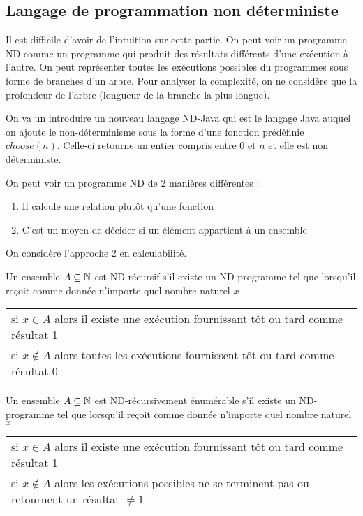 
\subsection{Langage de programmation non déterministe}
\label{ssub:langague_de_programmation_non_d_terministe}

\begin{myrem}
	Il est difficile d'avoir de l'intuition sur cette partie. On peut
	voir un programme ND comme un programme qui produit des résultats
	différents d'une exécution à l'autre. On peut représenter toutes
	les exécutions possibles du programmes sous forme de branches d'un
	arbre. Pour analyser la complexité, on ne
	considère que la profondeur de l'arbre (longueur de la branche
	la plus longue).
\end{myrem}

On va un introduire un nouveau langage ND-Java qui est le langage Java
auquel on ajoute le non-déterminisme sous la forme d'une fonction
prédéfinie $choose(n)$. Celle-ci retourne un entier compris entre $0$ et $n$ et elle
est non déterministe.

On peut voir un programme ND de 2 manières différentes :
\begin{enumerate}
	\item Il calcule une relation plutôt qu'une fonction
	\item C'est un moyen de décider si un élément appartient à un
		ensemble
\end{enumerate}
On considère l'approche 2 en calculabilité.

\begin{mydef}[ND-récursif] \label{def:ND-rec}
	Un ensemble $A \subseteq \mathbb{N}$ est ND-récursif s’il existe un
	ND-programme tel que lorsqu'il reçoit comme donnée n'importe quel nombre
	naturel $x$ \\
	\begin{tabular}{l}
	si $x \in A$ alors il existe une exécution fournissant tôt ou tard
	comme résultat 1 \\
	si $x \notin A$ alors toutes les exécutions fournissent tôt ou tard
	comme résultat 0 \\
	\end{tabular}
\end{mydef}

\begin{mydef} \label{def:ND-recenum}
	Un ensemble $A \subseteq \mathbb{N}$ est ND-récursivement énumérable s’il existe un
	ND-programme tel que lorsqu'il reçoit comme donnée n'importe quel nombre
	naturel $x$ \\
	\begin{tabular}{l}
	si $x \in A$ alors il existe une exécution fournissant tôt ou tard
	comme résultat 1 \\
	si $x \notin A$ alors les exécutions possibles ne se terminent pas ou
	retournent un résultat $\neq 1$ \\
	\end{tabular}
\end{mydef}

